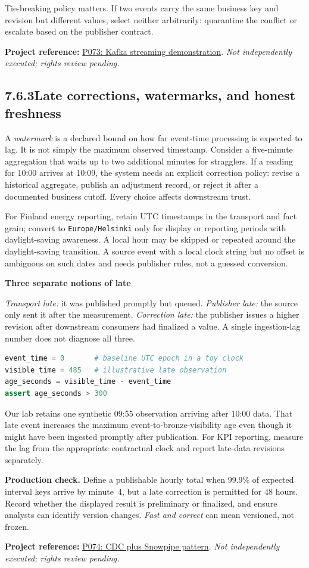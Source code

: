 \documentclass[11pt,twoside]{article}
\newcommand{\topic}[2]{\subsection*{#1\quad #2}}
\newcommand{\repo}[2]{\par\begingroup\fontsize{8.0}{9.6}\selectfont\sffamily\color{inkgray}\textbf{Project reference:} \href{#2}{#1}. \textit{Not independently executed; rights review pending.}\par\endgroup}
\begin{document}
Tie-breaking policy matters. If two events carry the same business key and revision but different values, select neither arbitrarily: quarantine the conflict or escalate based on the publisher contract.
\repo{P073: Kafka streaming demonstration}{https://github.com/Snowflake-Labs/sfguide-kafka-interactive-tables-streaming}
\newpage
\topic{7.6.3}{Late corrections, watermarks, and honest freshness}
A \emph{watermark} is a declared bound on how far event-time processing is expected to lag. It is not simply the maximum observed timestamp. Consider a five-minute aggregation that waits up to two additional minutes for stragglers. If a reading for 10:00 arrives at 10:09, the system needs an explicit correction policy: revise a historical aggregate, publish an adjustment record, or reject it after a documented business cutoff. Every choice affects downstream trust.

For Finland energy reporting, retain UTC timestamps in the transport and fact grain; convert to \texttt{Europe/Helsinki} only for display or reporting periods with daylight-saving awareness. A local hour may be skipped or repeated around the daylight-saving transition. A source event with a local clock string but no offset is ambiguous on such dates and needs publisher rules, not a guessed conversion.
\begin{whitebox}\textbf{Three separate notions of late}\par
\emph{Transport late:} it was published promptly but queued. \emph{Publisher late:} the source only sent it after the measurement. \emph{Correction late:} the publisher issues a higher revision after downstream consumers had finalized a value. A single ingestion-lag number does not diagnose all three.\end{whitebox}
\begin{lstlisting}[language=Python,caption={Synthetic event age (seconds), not a service benchmark.}]
event_time = 0       # baseline UTC epoch in a toy clock
visible_time = 485   # illustrative late observation
age_seconds = visible_time - event_time
assert age_seconds > 300
\end{lstlisting}
Our lab retains one synthetic 09:55 observation arriving after 10:00 data. That late event increases the maximum event-to-bronze-visibility age even though it might have been ingested promptly after publication. For KPI reporting, measure the lag from the appropriate contractual clock and report late-data revisions separately.

\textbf{Production check.} Define a publishable hourly total when 99.9\% of expected interval keys arrive by minute~4, but a late correction is permitted for 48 hours. Record whether the displayed result is preliminary or finalized, and ensure analysts can identify version changes. \emph{Fast and correct} can mean versioned, not frozen.
\repo{P074: CDC plus Snowpipe pattern}{https://github.com/machkuma/aws-dms-s3-snowflake-cdc-snowpipe}
\newpage
\end{document}
